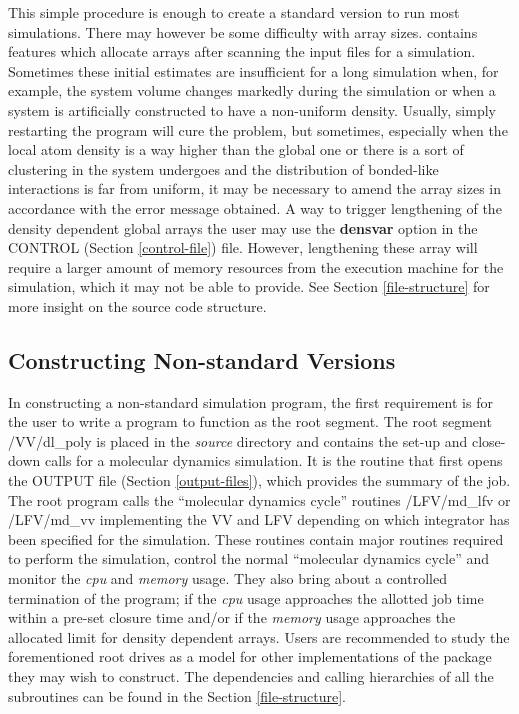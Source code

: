 This simple procedure is enough to create a standard version to run
most simulations.  There may however be some difficulty with array
sizes.  \D contains features which allocate arrays after scanning
the input files for a simulation.  Sometimes these initial estimates
are insufficient for a long simulation when, for example, the system
volume changes markedly during the simulation or when a system is
artificially constructed to have a non-uniform density. Usually,
simply restarting the program will cure the problem, but sometimes,
especially when the local atom density is a way higher than the
global one or there is a sort of clustering in the system undergoes
and the distribution of bonded-like interactions is far from uniform,
it may be necessary to amend the array sizes in accordance with the
error message obtained.  A way to trigger lengthening of the density
dependent global arrays the user may use the {\bf densvar} option in
the CONTROL (Section \ref{control-file}) file.  However, lengthening
these array will require a larger amount of memory resources from the
execution machine for the simulation, which it may not be able to
provide.  See Section \ref{file-structure} for more insight on the
\D source code structure.

\subsection{Constructing Non-standard Versions}

In constructing a non-standard \D simulation program, the first
requirement is for the user to write a program to function as the
root segment.  The root segment {\sc /VV/dl\_poly} is placed in the
{\em source} directory and contains the set-up and close-down calls
for a molecular dynamics simulation.  It is the routine that first
opens the OUTPUT file (Section \ref{output-files}), which provides
the summary of the job.  The root program calls the ``molecular
dynamics cycle'' routines {\sc /LFV/md\_lfv} or {\sc /LFV/md\_vv}
implementing the VV and LFV depending on which integrator has been
specified for the simulation. These routines contain major routines
required to perform the simulation, control the normal ``molecular
dynamics cycle'' and monitor the {\em cpu} and {\em memory} usage.
They also bring about a controlled termination of the program; if
the {\em cpu} usage approaches the allotted job time within a
pre-set closure time and/or if the {\em memory} usage approaches the
allocated limit for density dependent arrays.   Users are
recommended to study the forementioned root drives as a model for
other implementations of the package they may wish to construct. The
dependencies and calling hierarchies of all the \D subroutines can
be found in the Section \ref{file-structure}.

